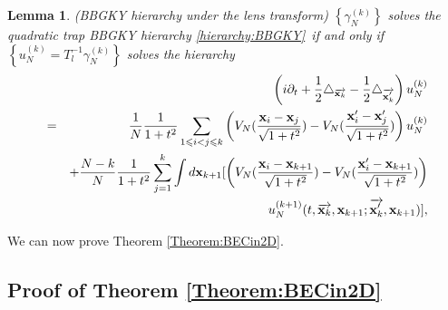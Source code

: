 \documentclass[reqno]{amsart}
\theoremstyle{plain}
\newtheorem{lemma}{Lemma}
\numberwithin{equation}{section}
\begin{document}
\begin{lemma}
(BBGKY hierarchy under the lens transform) $\left\{ \gamma
_{N}^{(k)}\right\} $ solves the quadratic trap BBGKY hierarchy \ref{hierarchy:BBGKY}\ if and only if $\left\{ u_{N}^{(k)}=T_{l}^{-1}\gamma
_{N}^{(k)}\right\} $ solves the hierarchy\begin{eqnarray}
&&\left( i\partial _{t}+\frac{1}{2}\triangle _{\overrightarrow{\mathbf{x}_{k}}}-\frac{1}{2}\triangle _{\overrightarrow{\mathbf{x}_{k}^{\prime }}}\right)
u_{N}^{(k)}  \label{hiearchy:BBGKY-T} \\
&=&\frac{1}{N}\frac{1}{1+t^{2}}\sum_{1\leqslant i<j\leqslant k}\left( V_{N}(\frac{\mathbf{x}_{i}-\mathbf{x}_{j}}{\sqrt{1+t^{2}}})-V_{N}(\frac{\mathbf{x}_{i}^{\prime }-\mathbf{x}_{j}^{\prime }}{\sqrt{1+t^{2}}})\right) u_{N}^{(k)}
\notag \\
&&+\frac{N-k}{N}\frac{1}{1+t^{2}}\sum_{j=1}^{k}\int d\mathbf{x}_{k+1}[\left(
V_{N}(\frac{\mathbf{x}_{i}-\mathbf{x}_{k+1}}{\sqrt{1+t^{2}}})-V_{N}(\frac{\mathbf{x}_{i}^{\prime }-\mathbf{x}_{k+1}}{\sqrt{1+t^{2}}})\right)  \notag \\
&&u_{N}^{(k+1)}(t,\overrightarrow{\mathbf{x}_{k}},\mathbf{x}_{k+1};\overrightarrow{\mathbf{x}_{k}^{\prime }},\mathbf{x}_{k+1})],  \notag
\end{eqnarray}
\end{lemma}

We can now prove Theorem \ref{Theorem:BECin2D}.

\subsection{Proof of Theorem \protect\ref{Theorem:BECin2D}}
\end{document}
